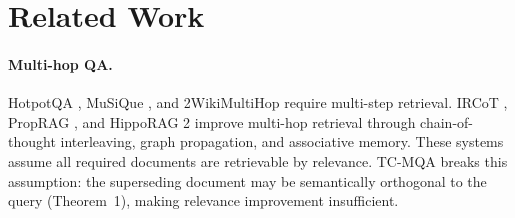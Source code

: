 \documentclass[11pt]{article}
\begin{document}
\begin{table}[h]
\centering
\small
{}
\caption{Real-world benchmark summary (TCA@5 with 95\% Wilson CIs). ``Two-Stage'' uses BM25 anchor in security and medical, Dense anchor in legal (best per-domain). Two-Stage 95\% CIs: GHSA [0.937, 0.990], SCOTUS [0.865, 0.961], FDA [0.735, 0.808]. Legal BM25 is high (0.893 [0.826, 0.936]); BM25 and Two-Stage CIs overlap at n~$=122$ (see \S\ref{sec:legal_realworld}). GHSA and FDA provide the cleaner evidence: both BM25 and Dense collapse ($\leq 0.270$), while Two-Stage recovers to $\geq 0.774$ with non-overlapping CIs against both baselines. Medical shows the most severe collapse: therapeutic vocabulary shares no terms with recall enforcement vocabulary (BM25~$= 0.004$ [0.001, 0.014]).}
\label{tab:realworld_summary}
\end{table}

\section{Related Work}
\label{sec:related}

\paragraph{Multi-hop QA.} HotpotQA \cite{yang2018hotpotqa}, MuSiQue \cite{trivedi2022musique}, and 2WikiMultiHop \cite{ho2020constructing} require multi-step retrieval. IRCoT \cite{trivedi2023interleaving}, PropRAG \cite{tang2025proprag}, and HippoRAG 2 \cite{gutierrez2025hipporag2} improve multi-hop retrieval through chain-of-thought interleaving, graph propagation, and associative memory. These systems assume all required documents are retrievable by relevance. TC-MQA breaks this assumption: the superseding document may be semantically orthogonal to the query (Theorem~1), making relevance improvement insufficient.
\end{document}
